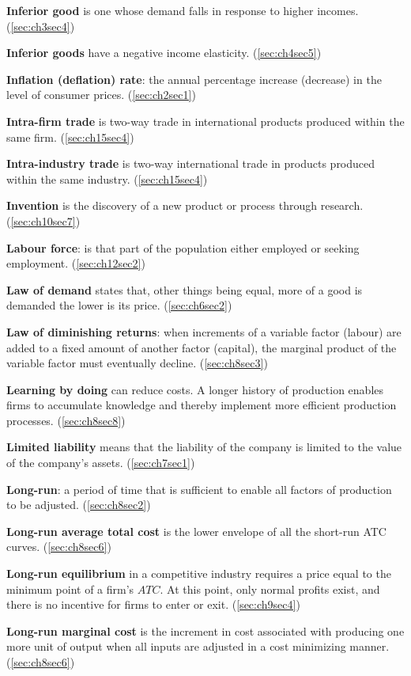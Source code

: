 \textbf{Inferior good} is one whose demand falls in response to higher incomes. (\ref{sec:ch3sec4})

\textbf{Inferior goods} have a negative income elasticity. (\ref{sec:ch4sec5})

\textbf{Inflation (deflation) rate}: the annual percentage increase (decrease) in the level of consumer prices. (\ref{sec:ch2sec1})

\textbf{Intra-firm trade} is two-way trade in international products produced within the same firm. (\ref{sec:ch15sec4})

\textbf{Intra-industry trade} is two-way international trade in products produced within the same industry. (\ref{sec:ch15sec4})

\textbf{Invention} is the discovery of a new product or process through research. (\ref{sec:ch10sec7})

\textbf{Labour force}: is that part of the population either employed or seeking employment. (\ref{sec:ch12sec2})

\textbf{Law of demand} states that, other things being equal, more of a good is demanded the lower is its price. (\ref{sec:ch6sec2})

\textbf{Law of diminishing returns}: when increments of a variable factor (labour) are added to a fixed amount of another factor (capital), the marginal product of the variable factor must eventually decline. (\ref{sec:ch8sec3})

\textbf{Learning by doing} can reduce costs. A longer history of production enables firms to accumulate knowledge and thereby implement more efficient production processes. (\ref{sec:ch8sec8})

\textbf{Limited liability} means that the liability of the company is limited to the value of the company's assets. (\ref{sec:ch7sec1})

\textbf{Long-run}: a period of time that is sufficient to enable all factors of production to be adjusted. (\ref{sec:ch8sec2})

\textbf{Long-run average total cost} is the lower envelope of all the short-run ATC curves. (\ref{sec:ch8sec6})

\textbf{Long-run equilibrium} in a competitive industry requires a price equal to the minimum point of a firm's $ATC$. At this point, only normal profits exist, and there is no incentive for firms to enter or exit. (\ref{sec:ch9sec4})

\textbf{Long-run marginal cost} is the increment in cost associated with producing one more unit of output when all inputs are adjusted in a cost minimizing manner. (\ref{sec:ch8sec6})


